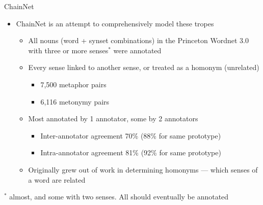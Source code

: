 \documentclass[xetex]{beamer}  %
\begin{document}
\begin{frame}{ChainNet}

  \begin{itemize}
  \item ChainNet is an attempt to comprehensively model these tropes \citep{maudslay-etal-2024-chainnet-structured,Bond:Maudslay:2025}
    \begin{itemize}
    \item All nouns (word + synset combinations) in the
      Princeton Wordnet 3.0 \citep{_Fellbaum:1998} with three or more senses$^*$
      were annotated
    \item Every sense linked to another sense, or treated as a homonym (unrelated)
      \begin{itemize}
      \item 7,500 metaphor pairs
      \item 6,116 metonymy pairs
      \end{itemize}
  \item Most annotated by 1 annotator, some by 2 annotators
    \begin{itemize}
    \item Inter-annotator agreement 70\% (88\% for same prototype)
    \item Intra-annotator agreement 81\% (92\% for same prototype)
    \end{itemize}
  \item Originally grew out of work in determining homonyms --- which senses of a word are related
  \end{itemize}

\end{itemize}

\begin{small}
 $^*$ almost, and some with two senses.   All should eventually be annotated \\
\end{small}
\end{frame}
\end{document}

